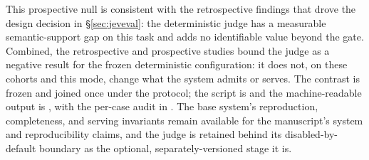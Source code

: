 This prospective null is consistent with the retrospective findings that
drove the design decision in \S\ref{sec:jeveval}: the deterministic
judge has a measurable semantic-support gap on this task and adds no
identifiable value beyond the gate. Combined, the retrospective and
prospective studies bound the judge as a negative result for the frozen
deterministic configuration: it does not, on these cohorts and this mode,
change what the system admits or serves. The contrast is frozen and joined
once under the protocol; the script is
 and the machine-readable
output is
,
with the per-case audit in
.
The base system's reproduction, completeness, and serving invariants
remain available for the manuscript's system and reproducibility claims,
and the judge is retained behind its disabled-by-default boundary as the
optional, separately-versioned stage it is.
\label{sec:threats}

